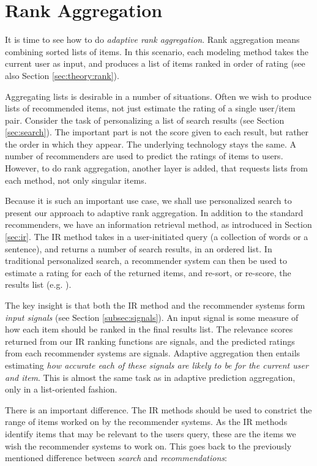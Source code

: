 \section{Rank Aggregation}
\label{sec:methods:rank}

It is time to see how to do \emph{adaptive rank aggregation}. 
Rank aggregation means combining sorted lists of items.
In this scenario, each modeling method takes the current user as input, and produces a
list of items ranked in order of rating (see also Section \ref{sec:theory:rank}).

Aggregating lists is desirable in a number of situations.
Often we wish to produce lists of recommended items, not just estimate the rating of a single user/item pair.
Consider the task of personalizing a list of search results
(see Section \ref{sec:search}). The important part is not the score
given to each result, but rather the order in which they appear.
The underlying technology stays the same. A number of recommenders are used to predict the ratings
of items to users. However, to do rank aggregation, another layer is added, that requests lists from each method,
not only singular items.

Because it is such an important use case, we shall use personalized search to present our approach to adaptive rank aggregation.
In addition to the standard recommenders, we have an information retrieval method,
as introduced in Section \ref{sec:ir}.
The IR method takes in a user-initiated query (a collection of words or a sentence), and returns a number of 
search results, in an ordered list.
In traditional personalized search, a recommender system can then be used to estimate a rating for each of the returned items,
and re-sort, or re-score, the results list (e.g. \citet[p3]{Xu2008}).

The key insight is that both the IR method and the recommender systems form \emph{input signals}
(see Section \ref{subsec:signals}).
An input signal is some measure of how each item should be ranked in the final results list.
The relevance scores returned from our IR ranking functions are signals,
and the predicted ratings from each recommender systems are signals.
Adaptive aggregation then entails estimating \emph{how accurate each of these signals are likely to be for the current user and item}.
This is almost the same task as in adaptive prediction aggregation, only in a list-oriented fashion.

There is an important difference. 
The IR methods should be used to constrict the range of items worked on by the recommender systems.
As the IR methods identify items that may be relevant to the users query, these are the items we wish the recommender systems to work on.
This goes back to the previously mentioned difference between \emph{search} and \emph{recommendations}:

